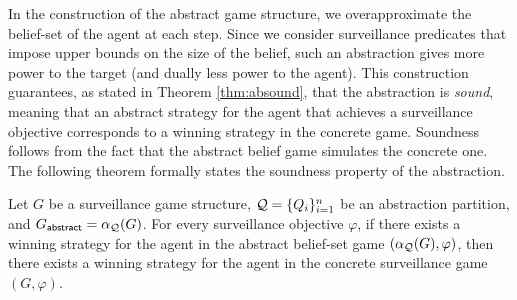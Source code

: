 In the construction of the abstract  game structure, we overapproximate the belief-set of the agent at each step. Since we consider surveillance predicates that impose upper bounds on the size of the belief, such an abstraction  gives more power to the target (and dually less power to the agent). This construction guarantees, as stated in Theorem \ref{thm:absound}, that the abstraction is \emph{sound}, meaning that an abstract strategy for the agent that achieves a surveillance objective corresponds to a winning strategy in the concrete game. Soundness follows from the fact that the abstract belief game simulates the concrete one. The following theorem formally states the soundness property of the abstraction.

\begin{theorem}\label{thm:absound}
Let $G$ be a surveillance game structure, $\mathcal{Q} = \{Q_i\}_{i=1}^n$ be an abstraction partition, and $G_{\mathsf{abstract}} = \alpha_{\mathcal{Q}}(G)$. For every surveillance objective $\varphi$, if there exists a winning strategy for the agent in the abstract belief-set game $(\alpha_{\mathcal{Q}}(G),\varphi)$, then there exists a winning strategy for the agent in the concrete surveillance game $(G,\varphi)$.
\end{theorem}

